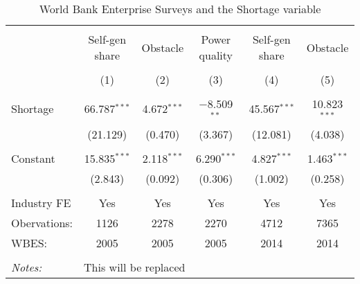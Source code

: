 
\begin{table}[!htbp] \centering 
  \caption{World Bank Enterprise Surveys and the Shortage variable} 
  \label{tab:wbes_validity} 
\small 
\begin{tabular}{@{\extracolsep{5pt}}lccccc} 
\\[-1.8ex]\hline 
\hline \\[-1.8ex] 
 & Self-gen share & Obstacle & Power quality & Self-gen share & Obstacle \\ 
\\[-1.8ex] & (1) & (2) & (3) & (4) & (5)\\ 
\hline \\[-1.8ex] 
 Shortage & 66.787$^{***}$ & 4.672$^{***}$ & $-$8.509$^{**}$ & 45.567$^{***}$ & 10.823$^{***}$ \\ 
  & (21.129) & (0.470) & (3.367) & (12.081) & (4.038) \\ 
  & & & & & \\ 
 Constant & 15.835$^{***}$ & 2.118$^{***}$ & 6.290$^{***}$ & 4.827$^{***}$ & 1.463$^{***}$ \\ 
  & (2.843) & (0.092) & (0.306) & (1.002) & (0.258) \\ 
  & & & & & \\ 
Industry FE & Yes & Yes & Yes & Yes & Yes \\ 
Obervations: & 1126 & 2278 & 2270 & 4712 & 7365 \\ 
WBES: & 2005 & 2005 & 2005 & 2014 & 2014 \\ 
\hline \\[-1.8ex] 
\textit{Notes:} & \multicolumn{5}{l}{This will be replaced} \\ 
\end{tabular} 
\end{table} 
